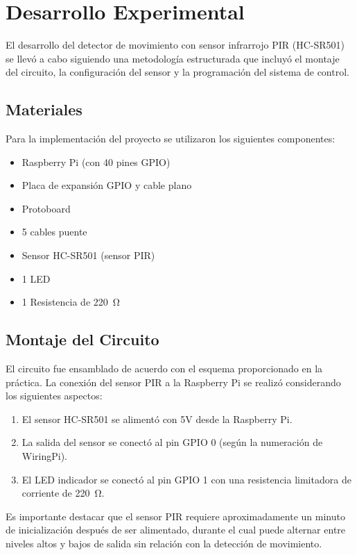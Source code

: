 \section{Desarrollo Experimental}
El desarrollo del detector de movimiento con sensor infrarrojo PIR (HC-SR501) se llevó a cabo siguiendo una metodología estructurada que incluyó el montaje del circuito, la configuración del sensor y la programación del sistema de control.

\subsection{Materiales}
Para la implementación del proyecto se utilizaron los siguientes componentes:
\begin{itemize}
	\item Raspberry Pi (con 40 pines GPIO)
	\item Placa de expansión GPIO y cable plano
	\item Protoboard
	\item 5 cables puente
	\item Sensor HC-SR501 (sensor PIR)
	\item 1 LED
	\item 1 Resistencia de \SI{220}{\ohm}
\end{itemize}

\subsection{Montaje del Circuito}
El circuito fue ensamblado de acuerdo con el esquema proporcionado en la práctica. La conexión del sensor PIR a la Raspberry Pi se realizó considerando los siguientes aspectos:

\begin{enumerate}
	\item El sensor HC-SR501 se alimentó con 5V desde la Raspberry Pi.
	\item La salida del sensor se conectó al pin GPIO 0 (según la numeración de WiringPi).
	\item El LED indicador se conectó al pin GPIO 1 con una resistencia limitadora de corriente de \SI{220}{\ohm}.
\end{enumerate}

Es importante destacar que el sensor PIR requiere aproximadamente un minuto de inicialización después de ser alimentado, durante el cual puede alternar entre niveles altos y bajos de salida sin relación con la detección de movimiento.

